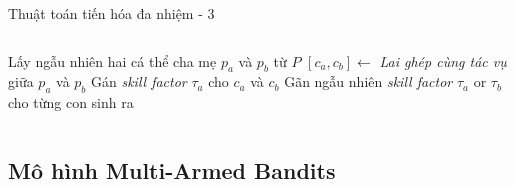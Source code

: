 \begin{frame}{Thuật toán tiến hóa đa nhiệm - 3}
\begin{columns}
\begin{column}{0.45\textwidth}
\begin{algorithm}[H]
                \begin{algorithmic}[1]
                    \State Lấy ngẫu nhiên hai cá thể cha mẹ $p_a$ và $p_b$ từ $P$
                        \State $[c_a, c_b] \leftarrow$ \emph{Lai ghép cùng tác vụ} giữa $p_a$ và $p_b$
                        \State Gán \emph{skill factor} $\tau_a$ cho $c_a$ và $c_b$
                        \State Gãn ngẫu nhiên \emph{skill factor} $\tau_a$ or $\tau_b$ cho từng con sinh ra
                    \EndIf
                \end{algorithmic}
                \label{alg:preliminary:mfea}
            \end{algorithm}
        \end{column}
    \end{columns}
\end{frame}

\subsection{Mô hình Multi-Armed Bandits}

